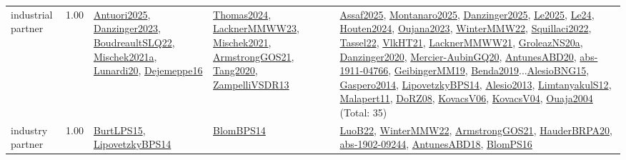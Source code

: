 {\begin{longtable}{p{3cm}r>{\raggedright\arraybackslash}p{6cm}>{\raggedright\arraybackslash}p{6cm}>{\raggedright\arraybackslash}p{8cm}}
\index{industrial partner}\index{Benchmarks!industrial partner}industrial partner &  1.00 & \hyperref[detail:Antuori2025]{Antuori2025}, \hyperref[detail:Danzinger2023]{Danzinger2023}, \hyperref[detail:BoudreaultSLQ22]{BoudreaultSLQ22}, \hyperref[detail:Mischek2021a]{Mischek2021a}, \hyperref[detail:Lunardi20]{Lunardi20}, \hyperref[detail:Dejemeppe16]{Dejemeppe16} & \hyperref[detail:Thomas2024]{Thomas2024}, \hyperref[detail:LacknerMMWW23]{LacknerMMWW23}, \hyperref[detail:Mischek2021]{Mischek2021}, \hyperref[detail:ArmstrongGOS21]{ArmstrongGOS21}, \hyperref[detail:Tang2020]{Tang2020}, \hyperref[detail:ZampelliVSDR13]{ZampelliVSDR13} & \hyperref[detail:Assaf2025]{Assaf2025}, \hyperref[detail:Montanaro2025]{Montanaro2025}, \hyperref[detail:Danzinger2025]{Danzinger2025}, \hyperref[detail:Le2025]{Le2025}, \hyperref[detail:Le24]{Le24}, \hyperref[detail:Houten2024]{Houten2024}, \hyperref[detail:Oujana2023]{Oujana2023}, \hyperref[detail:WinterMMW22]{WinterMMW22}, \hyperref[detail:Squillaci2022]{Squillaci2022}, \hyperref[detail:Tassel22]{Tassel22}, \hyperref[detail:VlkHT21]{VlkHT21}, \hyperref[detail:LacknerMMWW21]{LacknerMMWW21}, \hyperref[detail:GroleazNS20a]{GroleazNS20a}, \hyperref[detail:Danzinger2020]{Danzinger2020}, \hyperref[detail:Mercier-AubinGQ20]{Mercier-AubinGQ20}, \hyperref[detail:AntunesABD20]{AntunesABD20}, \hyperref[detail:abs-1911-04766]{abs-1911-04766}, \hyperref[detail:GeibingerMM19]{GeibingerMM19}, \hyperref[detail:Benda2019]{Benda2019}...\hyperref[detail:AlesioBNG15]{AlesioBNG15}, \hyperref[detail:Gaspero2014]{Gaspero2014}, \hyperref[detail:LipovetzkyBPS14]{LipovetzkyBPS14}, \hyperref[detail:Alesio2013]{Alesio2013}, \hyperref[detail:LimtanyakulS12]{LimtanyakulS12}, \hyperref[detail:Malapert11]{Malapert11}, \hyperref[detail:DoRZ08]{DoRZ08}, \hyperref[detail:KovacsV06]{KovacsV06}, \hyperref[detail:KovacsV04]{KovacsV04}, \hyperref[detail:Ouaja2004]{Ouaja2004} (Total: 35)\\
\index{industry partner}\index{Benchmarks!industry partner}industry partner &  1.00 & \hyperref[detail:BurtLPS15]{BurtLPS15}, \hyperref[detail:LipovetzkyBPS14]{LipovetzkyBPS14} & \hyperref[detail:BlomBPS14]{BlomBPS14} & \hyperref[detail:LuoB22]{LuoB22}, \hyperref[detail:WinterMMW22]{WinterMMW22}, \hyperref[detail:ArmstrongGOS21]{ArmstrongGOS21}, \hyperref[detail:HauderBRPA20]{HauderBRPA20}, \hyperref[detail:abs-1902-09244]{abs-1902-09244}, \hyperref[detail:AntunesABD18]{AntunesABD18}, \hyperref[detail:BlomPS16]{BlomPS16}\\

\end{longtable}}
